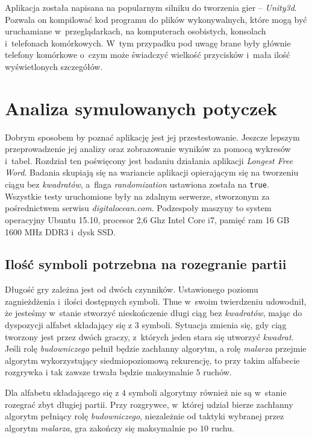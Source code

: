 \documentclass[document]{xmgr}
\begin{document}
Aplikacja została napisana na popularnym silniku do tworzenia gier -- \emph{Unity3d}. Pozwala on kompilować kod programu do plików wykonywalnych, które mogą być uruchamiane w~przeglądarkach, na komputerach osobistych, konsolach i~telefonach komórkowych. W~tym przypadku pod uwagę brane były głównie telefony komórkowe o~czym może świadczyć wielkość przycisków i~mała ilość wyświetlonych szczegółów.



\chapter{Analiza symulowanych potyczek} 
Dobrym sposobem by poznać aplikację jest jej przestestowanie. Jeszcze lepszym przeprowadzenie jej analizy oraz zobrazowanie wyników za pomocą wykresów i~tabel. Rozdział ten poświęcony jest badaniu działania aplikacji \emph{Longest Free Word}. Badania skupiają się na wariancie aplikacji opierającym się na tworzeniu ciągu bez \emph{kwadratów}, a~flaga \emph{randomization} ustawiona została na \texttt{true}. Wszystkie testy uruchomione były na zdalnym serwerze, stworzonym za pośrednictwem serwisu \emph{digitalocean.com}. Podzespoły maszyny to system operacyjny Ubuntu 15.10, procesor 2,6 Ghz Intel Core i7, pamięć ram 16 GB 1600 MHz DDR3 i~dysk SSD.



\section{Ilość symboli potrzebna na rozegranie partii}
Długość gry zależna jest od dwóch czynników. Ustawionego poziomu zagnieżdżenia i~ilości dostępnych symboli. Thue w~swoim twierdzeniu \cite{repetition} udowodnił, że jesteśmy w~stanie stworzyć nieskończenie długi ciąg bez \emph{kwadratów}, mając do dyspozycji alfabet składający się z $3$ symboli. Sytuacja zmienia się, gdy ciąg tworzony jest przez dwóch graczy, z~których jeden stara się utworzyć \emph{kwadrat}. Jeśli  rolę \emph{budowniczego} pełnił będzie zachłanny algorytm, a rolę \emph{malarza} przejmie algorytm wykorzystujący siedmiopoziomową rekurencję, to przy takim alfabecie rozgrywka i tak zawsze trwała będzie maksymalnie $5$ ruchów. 

Dla alfabetu składającego się z $4$ symboli algorytmy również nie są w~stanie rozegrać zbyt długiej partii. Przy rozgrywce, w~której udział bierze zachłanny algorytm pełniący rolę \emph{budowniczego}, niezależnie od taktyki wybranej przez algorytm \emph{malarza}, gra zakończy się maksymalnie po $10$ ruchu.
\end{document}
